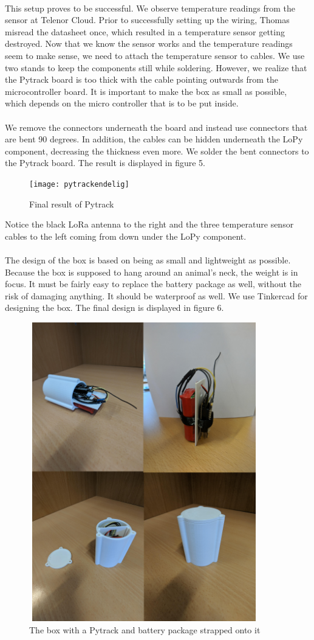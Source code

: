 		\\
		This setup proves to be successful. We observe temperature readings from the sensor at Telenor Cloud. Prior to successfully setting up the wiring, Thomas misread the datasheet once, which resulted in a temperature sensor getting destroyed. Now that we know the sensor works and the temperature readings seem to make sense, we need to attach the temperature sensor to cables. We use two stands to keep the components still while soldering. However, we realize that the Pytrack board is too thick with the cable pointing outwards from the microcontroller board. It is important to make the box as small as possible, which depends on the micro controller that is to be put inside. 
		\\\\
		We remove the connectors underneath the board and instead use connectors that are bent 90 degrees. In addition, the cables can be hidden underneath the LoPy component, decreasing the thickness even more. We solder the bent connectors to the Pytrack board. The result is displayed in figure 5. 
		\begin{figure}[h]
			\caption{Final result of Pytrack}
			\texttt{[image: pytrackendelig]}
		\end{figure}
		Notice the black LoRa antenna to the right and the three temperature sensor cables to the left coming from down under the LoPy component. 
		\\\\
		The design of the box is based on being as small and lightweight as possible. Because the box is supposed to hang around an animal’s neck, the weight is in focus. It must be fairly easy to replace the battery package as well, without the risk of damaging anything. It should be waterproof as well. We use Tinkercad for designing the box. The final design is displayed in figure 6.
		\begin{figure}[h]
			\caption{The box with a Pytrack and battery package strapped onto it}
			\includegraphics[width=10cm, height=13cm]{box}
		\end{figure}
